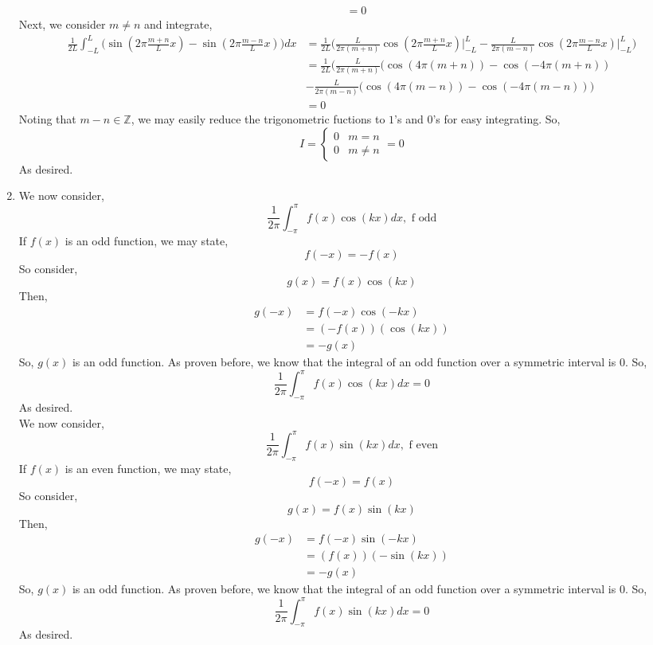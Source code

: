 \documentclass[letterpaper,10pt]{article}
\newcommand{\Z}{\mathbb{Z}}
\begin{document}
\begin{enumerate}
\begin{align*}
&= 0
\end{align*}
Next, we consider $m\neq n$ and integrate,
\begin{align*}
\frac{1}{2L}\int_{-L}^{L}\bigg(\sin(2\pi \frac{m+n}{L}x)-\sin(2\pi \frac{m-n}{L}x)\bigg)dx &= \frac{1}{2L}\bigg(\frac{L}{2\pi (m+n)}\cos(2\pi \frac{m+n}{L}x)\bigg|_{-L}^L-\frac{L}{2\pi (m-n)}\cos(2\pi \frac{m-n}{L}x)\bigg|_{-L}^L\bigg)\\
&= \frac{1}{2L}\bigg(\frac{L}{2\pi (m+n)}(\cos(4\pi (m+n))-\cos(-4\pi (m+n))\\
&-\frac{L}{2\pi (m-n)}(\cos(4\pi (m-n))-\cos(-4\pi (m-n))\bigg)\\
&= 0
\end{align*}
Noting that $m-n\in \Z$, we may easily reduce the trigonometric fuctions to $1$'s and $0$'s for easy integrating. So,
\[I=\begin{cases}
0 & m=n\\
0 & m\neq n
\end{cases}=0\]
As desired.
\item We now consider,
\[\frac{1}{2\pi}\int_{-\pi}^{\pi}f(x)\cos(kx)dx, \text{ f odd}\]
If $f(x)$ is an odd function, we may state,
\[f(-x)=-f(x)\]
So consider,
\[g(x)=f(x)\cos(kx)\]
Then,
\begin{align*}
g(-x) &= f(-x)\cos(-kx) \\
&= (-f(x))(\cos(kx))\\
&= -g(x)
\end{align*}
So, $g(x)$ is an odd function. As proven before, we know that the integral of an odd function over a symmetric interval is $0$. So,
\[\frac{1}{2\pi}\int_{-\pi}^{\pi}f(x)\cos(kx)dx=0\]
As desired.\\
We now consider,
\[\frac{1}{2\pi}\int_{-\pi}^{\pi}f(x)\sin(kx)dx, \text{ f even}\]
If $f(x)$ is an even function, we may state,
\[f(-x)=f(x)\]
So consider,
\[g(x)=f(x)\sin(kx)\]
Then,
\begin{align*}
g(-x) &= f(-x)\sin(-kx) \\
&= (f(x))(-\sin(kx))\\
&= -g(x)
\end{align*}
So, $g(x)$ is an odd function. As proven before, we know that the integral of an odd function over a symmetric interval is $0$. So,
\[\frac{1}{2\pi}\int_{-\pi}^{\pi}f(x)\sin(kx)dx=0\]
As desired.
\end{enumerate}
\end{document}
